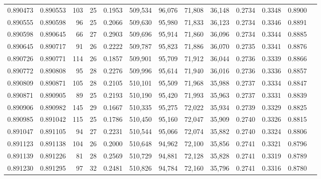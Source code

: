 \begin{tabular}{rrrrrrrrrrrrr}
0.890473 & 0.890553 &   103 &  25 &                                     0.1953 & 509,534 &  96,076 &  71,808 &  36,148 & 0.2734 & 0.3348 & 0.8900 \\
0.890555 & 0.890598 &    96 &  25 &                                     0.2066 & 509,630 &  95,980 &  71,833 &  36,123 & 0.2734 & 0.3346 & 0.8891 \\
0.890598 & 0.890645 &    66 &  27 &                                     0.2903 & 509,696 &  95,914 &  71,860 &  36,096 & 0.2734 & 0.3344 & 0.8885 \\
0.890645 & 0.890717 &    91 &  26 &                                     0.2222 & 509,787 &  95,823 &  71,886 &  36,070 & 0.2735 & 0.3341 & 0.8876 \\
0.890726 & 0.890771 &   114 &  26 &                                     0.1857 & 509,901 &  95,709 &  71,912 &  36,044 & 0.2736 & 0.3339 & 0.8866 \\
0.890772 & 0.890808 &    95 &  28 &                                     0.2276 & 509,996 &  95,614 &  71,940 &  36,016 & 0.2736 & 0.3336 & 0.8857 \\
0.890809 & 0.890871 &   105 &  28 &                                     0.2105 & 510,101 &  95,509 &  71,968 &  35,988 & 0.2737 & 0.3334 & 0.8847 \\
0.890871 & 0.890905 &    89 &  25 &                                     0.2193 & 510,190 &  95,420 &  71,993 &  35,963 & 0.2737 & 0.3331 & 0.8839 \\
0.890906 & 0.890982 &   145 &  29 &                                     0.1667 & 510,335 &  95,275 &  72,022 &  35,934 & 0.2739 & 0.3329 & 0.8825 \\
0.890985 & 0.891042 &   115 &  25 &                                     0.1786 & 510,450 &  95,160 &  72,047 &  35,909 & 0.2740 & 0.3326 & 0.8815 \\
0.891047 & 0.891105 &    94 &  27 &                                     0.2231 & 510,544 &  95,066 &  72,074 &  35,882 & 0.2740 & 0.3324 & 0.8806 \\
0.891123 & 0.891138 &   104 &  26 &                                     0.2000 & 510,648 &  94,962 &  72,100 &  35,856 & 0.2741 & 0.3321 & 0.8796 \\
0.891139 & 0.891226 &    81 &  28 &                                     0.2569 & 510,729 &  94,881 &  72,128 &  35,828 & 0.2741 & 0.3319 & 0.8789 \\
0.891230 & 0.891295 &    97 &  32 &                                     0.2481 & 510,826 &  94,784 &  72,160 &  35,796 & 0.2741 & 0.3316 & 0.8780 \\

\end{tabular}
